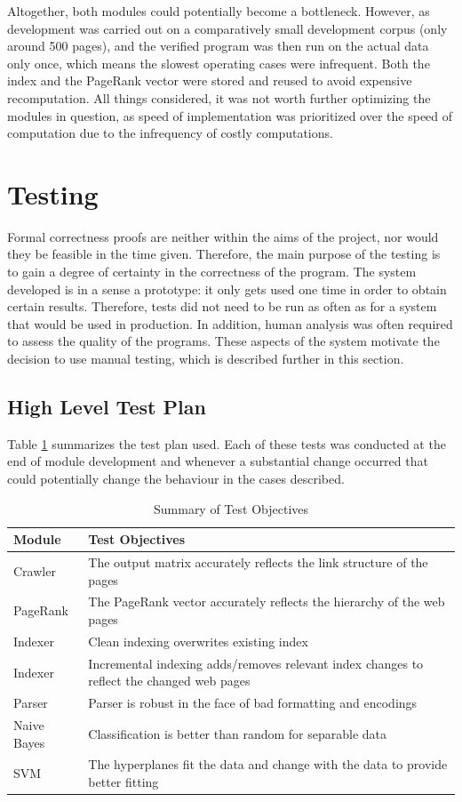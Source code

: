 \documentclass[12pt,notitlepage,twoside]{scrreprt}
\begin{document}
Altogether, both modules could potentially become a bottleneck. However, as development
was carried out on a comparatively small development corpus (only around 500 pages), and
the verified program was then run on the actual data only once, which means the slowest operating cases
were infrequent. Both the index and the PageRank vector were stored and reused to avoid
expensive recomputation. All things considered, it was not worth further optimizing the
modules in question, as speed of implementation was prioritized over the speed of
computation due to the infrequency of costly computations. 

\section{Testing}
Formal correctness proofs are neither within the aims of the project, nor would they be
feasible in the time given. Therefore, the main purpose of the testing is to gain a degree
of certainty in the correctness of the program. The system developed is in a sense a
prototype: it only gets used one time in order to obtain certain results. Therefore, tests
did not need to be run as often as for a system that would be used in production. In
addition, human analysis was often required to assess the quality of the programs. These
aspects of the system motivate the decision to use manual testing, which is described
further in this section. 
\subsection{High Level Test Plan}
Table \ref{tab:test} summarizes the test plan used. Each of these tests
was conducted at the end of module development and whenever a substantial change occurred
that could potentially change the behaviour in the cases described.
\begin{table}[h!]
	\begin{tabular}[h!]{l p{12cm}}
	\textbf{Module} & \textbf{Test Objectives}\\ \hline
Crawler & The output matrix accurately reflects the link structure of the pages \\
PageRank & The PageRank vector accurately reflects the hierarchy of the web pages \\
Indexer & Clean indexing overwrites existing index \\
Indexer & Incremental indexing adds/removes relevant index changes to reflect the changed
web pages \\
Parser & Parser is robust in the face of bad formatting and encodings \\
Naive Bayes & Classification is better than random for separable data \\
SVM & The hyperplanes fit the data and change with the data to provide better fitting 
\end{tabular}
\caption{Summary of Test Objectives\label{tab:test}}
\end{table}
\end{document}
